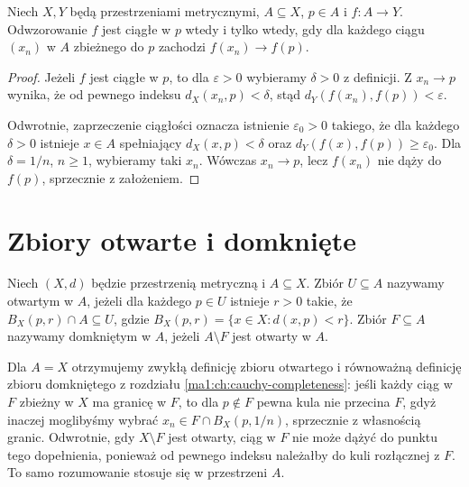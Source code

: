 \begin{twierdzenie}
\label{ma1:thm:continuity-sequential}
Niech $X,Y$ będą przestrzeniami metrycznymi, $A\subseteq X$, $p\in A$ i $f:A\to Y$. Odwzorowanie $f$ jest ciągłe w $p$ wtedy i tylko wtedy, gdy dla każdego ciągu $(x_n)$ w $A$ zbieżnego do $p$ zachodzi $f(x_n)\to f(p)$.
\end{twierdzenie}
\begin{proof}
Jeżeli $f$ jest ciągłe w $p$, to dla $\varepsilon>0$ wybieramy $\delta>0$ z definicji. Z $x_n\to p$ wynika, że od pewnego indeksu $d_X(x_n,p)<\delta$, stąd $d_Y(f(x_n),f(p))<\varepsilon$.

Odwrotnie, zaprzeczenie ciągłości oznacza istnienie $\varepsilon_0>0$ takiego, że dla każdego $\delta>0$ istnieje $x\in A$ spełniający $d_X(x,p)<\delta$ oraz $d_Y(f(x),f(p))\ge\varepsilon_0$. Dla $\delta=1/n$, $n\ge1$, wybieramy taki $x_n$. Wówczas $x_n\to p$, lecz $f(x_n)$ nie dąży do $f(p)$, sprzecznie z założeniem.
\end{proof}

\section{Zbiory otwarte i domknięte}
\begin{definicja}
\label{ma1:def:relative-open}
Niech $(X,d)$ będzie przestrzenią metryczną i $A\subseteq X$. Zbiór $U\subseteq A$ nazywamy otwartym w $A$, jeżeli dla każdego $p\in U$ istnieje $r>0$ takie, że $B_X(p,r)\cap A\subseteq U$, gdzie $B_X(p,r)=\{x\in X:d(x,p)<r\}$. Zbiór $F\subseteq A$ nazywamy domkniętym w $A$, jeżeli $A\setminus F$ jest otwarty w $A$.
\end{definicja}
Dla $A=X$ otrzymujemy zwykłą definicję zbioru otwartego i równoważną definicję zbioru domkniętego z rozdziału \ref{ma1:ch:cauchy-completeness}: jeśli każdy ciąg w $F$ zbieżny w $X$ ma granicę w $F$, to dla $p\notin F$ pewna kula nie przecina $F$, gdyż inaczej moglibyśmy wybrać $x_n\in F\cap B_X(p,1/n)$, sprzecznie z własnością granic. Odwrotnie, gdy $X\setminus F$ jest otwarty, ciąg w $F$ nie może dążyć do punktu tego dopełnienia, ponieważ od pewnego indeksu należałby do kuli rozłącznej z $F$. To samo rozumowanie stosuje się w przestrzeni $A$.

